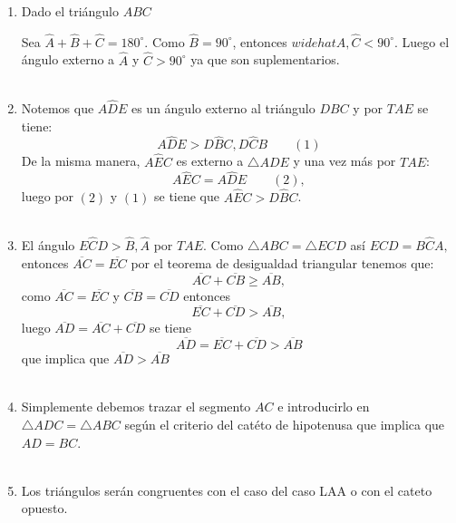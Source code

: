 \documentclass[10pt]{article}
\begin{document}
\begin{enumerate}
\item Dado el triángulo $ABC$ 
\begin{center}
\end{center}
Sea $\widehat{A}+\widehat{B}+\widehat{C} = 180^{\circ}$. Como $\widehat{B} = 90^{\circ}$, entonces $widehat{A},\widehat{C} < 90^{\circ}$. Luego el ángulo externo a $\widehat{A}$ y $\widehat{C} > 90^{\circ}$ ya que son suplementarios.\\\\

\item Notemos que $A\widehat{D}E$ es un ángulo externo al triángulo $DBC$ y por $TAE$ se tiene: $$A\widehat{D}E > D\widehat{B}C, D\widehat{C}B \qquad (1)$$ De la misma manera, $A\widehat{E}C$ es externo a $\triangle ADE$ y una vez más por $TAE$:
$$A\widehat{E}C = A\widehat{D}E \qquad (2),$$ luego por $(2)$ y $(1)$ se tiene que $A\widehat{E}C > D\widehat{B}C$.\\\\ 

\item El ángulo $E\widehat{C}D > \widehat{B}, \widehat{A}$ por $TAE$. Como $\triangle ABC = \triangle ECD$ así $E\widehat{C}D=B\widehat{C}A,$ entonces $\overline{AC} = \overline{EC}$ por el teorema de desigualdad triangular tenemos que: $$\overline{AC} + \overline{CB} \geq \overline{AB},$$ como $\overline{AC} = \overline{EC}$ y $\overline{CB} = \overline{CD}$ entonces $$\overline{EC} + \overline{CD} > \overline{AB},$$ luego $\overline{AD} = \overline{AC} + \overline{CD}$ se tiene $$\overline{AD} = \overline{EC} + \overline{CD} > \overline{AB}$$ que implica que $\overline{AD} > \overline{AB}$\\\\

\item Simplemente debemos trazar el segmento $AC$ e introducirlo en  $\triangle ADC = \triangle ABC$ según el criterio del catéto de hipotenusa que implica que $AD = BC$.\\\\

\item Los triángulos serán congruentes con el caso del caso LAA o con el cateto opuesto.\\\\


\end{enumerate}
\end{document}
